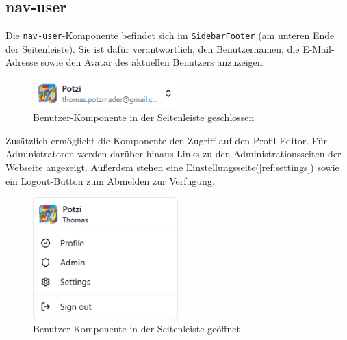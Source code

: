 \begin{inhalt}
\begin{enumerate}[label=\textbf{\arabic*.}]


\vspace{-1.75cm}

\subsection{nav-user}

Die \texttt{nav-user}-Komponente befindet sich im \texttt{SidebarFooter} (am unteren Ende der Seitenleiste).  
Sie ist dafür verantwortlich, den Benutzernamen, die E-Mail-Adresse sowie den Avatar des aktuellen Benutzers anzuzeigen.

\begin{figure}[!htb]
\centering
\includegraphics[width=0.5\textwidth]{files/Thomas/pics/Website/Sidebar/nav-user/user-component.png}
\caption[Benutzer-Komponente in der Sidebar]{Benutzer-Komponente in der Seitenleiste geschlossen}
\label{fig:nav_user_component}
\end{figure}

Zusätzlich ermöglicht die Komponente den Zugriff auf den Profil-Editor.  
Für Administratoren werden darüber hinaus Links zu den Administrationsseiten der Webseite angezeigt.  
Außerdem stehen eine Einstellungsseite(\ref{ref:settings}) sowie ein Logout-Button zum Abmelden zur Verfügung.


\begin{figure}[!htb]
\centering
\includegraphics[width=0.5\textwidth]{files/Thomas/pics/Website/Sidebar/nav-user/user-component-open.png}
\caption[Benutzer-Komponente in der Seitenleiste geöffnet]{Benutzer-Komponente in der Seitenleiste geöffnet}
\label{fig:gehaeuse_internet_bild}
\end{figure}




\end{enumerate}
\end{inhalt}
